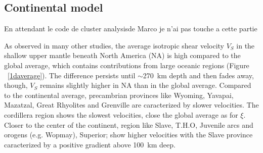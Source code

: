 \documentclass[12pt]{article}
\begin{document}



	\subsection{Continental model}

		En attendant le code de cluster analysisde Marco je n'ai pas touche a cette partie

		As observed in many other studies, the average isotropic shear velocity $V_S$ in the shallow upper mantle beneath North America (NA) is high compared to the global average, which contains contributions from large oceanic regions (Figure ~\ref{1daverage}). 
		The difference persists until $\sim$270~km depth and then fades away, though, $V_S$ remains slightly higher in NA than in the global average. 
		Compared to the continental average, precambrian provinces like Wyoming, Yavapai, Mazatzal, Great Rhyolites and Grenville are caracterized by slower velocities. 
		The cordillera region shows the slowest velocities, close the global average as for $\xi$. 
		Closer to the center of the continent, region like Slave, T.H.O, Juvenile arcs and orogens (e.g. Wopmay), Superior; show higher velocities with the Slave province caracterized by a positive gradient above 100~km deep.

\end{document}
